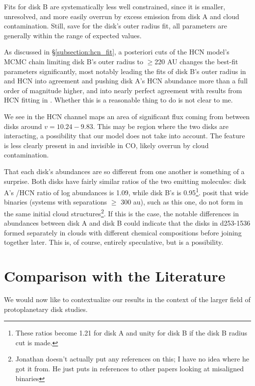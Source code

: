 Fits for disk B are systematically less well constrained, since it is smaller, unresolved, and more easily overrun by excess emission from disk A and cloud contamination. Still, save for the disk's outer radius fit, all parameters are generally within the range of expected values.

As discussed in \S\ref{subsection:hcn_fit}, a posteriori cuts of the HCN model's MCMC chain limiting disk B's outer radius to $\geq$220 AU changes the best-fit parameters significantly, most notably leading the fits of disk B's outer radius in \hco and HCN into agreement and pushing disk A's HCN abundance more than a full order of magnitude higher, and into nearly perfect agreement with results from HCN fitting in \citet{Factor2017}. Whether this is a reasonable thing to do is not clear to me.

We see in the HCN channel maps an area of significant flux coming from between disks around $ v = 10.24-9.83$. This may be region where the two disks are interacting, a possibility that our model does not take into account. The feature is less clearly present in \hco and invisible in CO, likely overrun by cloud contamination.


That each disk's abundances are so different from one another is something of a surprise. Both disks have fairly similar ratios of the two emitting molecules: disk A's \hco/HCN ratio of log abundances is 1.09, while disk B's is 0.95\footnote{These ratios become 1.21 for disk A and unity for disk B if the disk B radius cut is made.}. \citet{Williams2014} posit that wide binaries (systems with separations $\geq$ 300 au), such as this one, do not form in the same initial cloud structures\footnote{Jonathan doesn't actually put any references on this; I have no idea where he got it from. He just puts in references to other papers looking at misaligned binaries}. If this is the case, the notable differences in abundances between disk A and disk B could indicate that the disks in d253-1536 formed separately in clouds with different chemical compositions before joining together later. This is, of course, entirely speculative, but is a possibility.




\section{Comparison with the Literature}

We would now like to contextualize our results in the context of the larger field of protoplanetary disk studies.


